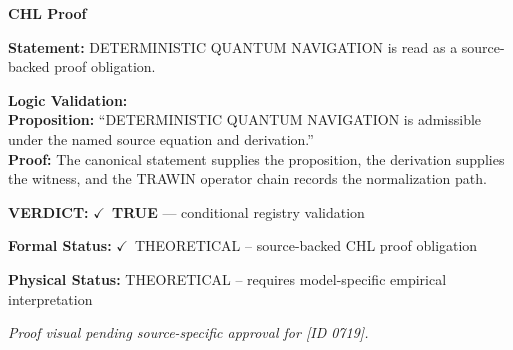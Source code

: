 \vspace{0.45em}
\noindent\textbf{CHL Proof}\par
\textbf{Statement:} DETERMINISTIC QUANTUM NAVIGATION is read as a source-backed proof obligation.

\textbf{Logic Validation:}\\
\textbf{Proposition:} ``DETERMINISTIC QUANTUM NAVIGATION is admissible under the named source equation and derivation.''\\
\textbf{Proof:} The canonical statement supplies the proposition, the derivation supplies the witness, and the TRAWIN operator chain records the normalization path.

\textbf{VERDICT:} \ensuremath{\checkmark}\ \textbf{TRUE} --- conditional registry validation

\textbf{Formal Status:} \ensuremath{\checkmark}\ THEORETICAL -- source-backed CHL proof obligation

\textbf{Physical Status:} THEORETICAL -- requires model-specific empirical interpretation
\par\vspace{0.45em}
\par
\vfill
\begingroup\footnotesize\itshape
Proof visual pending source-specific approval for [ID 0719].
\par\endgroup
\vfill
\endgroup
\endgroup
